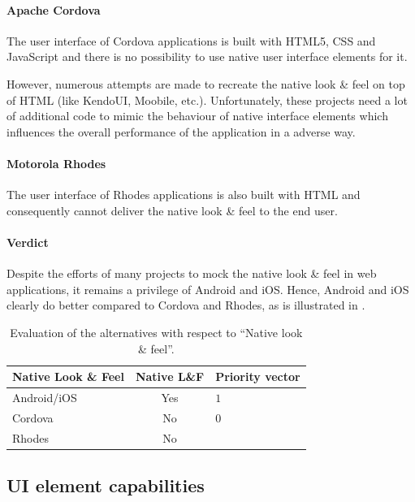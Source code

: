 \paragraph{Apache Cordova} The user interface of Cordova applications is built with HTML5, CSS and JavaScript and there is no possibility to use native user interface elements for it. 

However, numerous attempts are made to recreate the native look \& feel on top of HTML (like KendoUI, Moobile, etc.). Unfortunately, these projects need a lot of additional code to mimic the behaviour of native interface elements which influences the overall performance of the application in a adverse way.

\paragraph{Motorola Rhodes} The user interface of Rhodes applications is also built with HTML and consequently cannot deliver the native look \& feel to the end user.

\paragraph{Verdict} Despite the efforts of many projects to mock the native look \& feel in web applications, it remains a privilege of Android and iOS. Hence, Android and iOS clearly do better compared to Cordova and Rhodes, as is illustrated in .

\begin{table}[h!]
    \begin{center}
        \begin{tabular}{lcl}
            \hline
            \textbf{Native Look \& Feel} & Native L\&F & Priority vector \\
            \hline
            Android/iOS          & Yes      & $1$  \\
            Cordova              & No       & $0$  \\
            Rhodes               & No       & $$   \\
            \hline
        \end{tabular}
        \caption{Evaluation of the alternatives with respect to ``Native look \& feel''.}
        \label{tab:nlf}
    \end{center}
\end{table}

\subsection{UI element capabilities}

